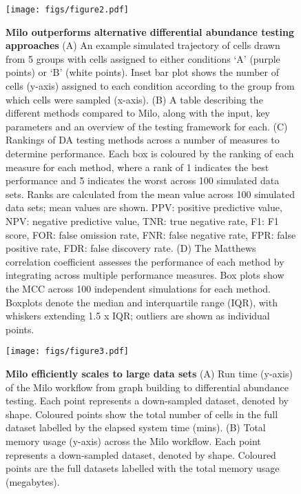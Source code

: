 \documentclass[
  10pt,
]{article}
\begin{document}
\begin{figure}
\centering
\texttt{[image: figs/figure2.pdf]}
\caption{\label{fig:fig-2}\textbf{Milo outperforms alternative differential abundance testing approaches}
(A) An example simulated trajectory of cells drawn from 5 groups with cells assigned to either conditions `A' (purple points) or `B' (white points). Inset bar plot shows the number of cells (y-axis) assigned to each condition according to the group from which cells were sampled (x-axis).
(B) A table describing the different methods compared to Milo, along with the input, key parameters and an overview of the testing framework for each.
(C) Rankings of DA testing methods across a number of measures to determine performance. Each box is coloured by the ranking of each measure for each method, where a rank of 1 indicates the best performance and 5 indicates the worst across 100 simulated data sets. Ranks are calculated from the mean value across 100 simulated data sets; mean values are shown. PPV: positive predictive value, NPV: negative predictive value, TNR: true negative rate, F1: F1 score, FOR: false omission rate, FNR: false negative rate, FPR: false positive rate, FDR: false discovery rate.
(D) The Matthews correlation coefficient assesses the performance of each method by integrating across multiple performance measures. Box plots show the MCC across 100 independent simulations for each method. Boxplots denote the median and interquartile range (IQR), with whiskers extending 1.5 x IQR; outliers are shown as individual points.}
\end{figure}







\begin{figure}
\centering
\texttt{[image: figs/figure3.pdf]}
\caption{\label{fig:fig-3}\textbf{Milo efficiently scales to large data sets}
(A) Run time (y-axis) of the Milo workflow from graph building to differential abundance testing. Each point represents a down-sampled dataset, denoted by shape. Coloured points show the total number of cells in the full dataset labelled by the elapsed system time (mins).
(B) Total memory usage (y-axis) across the Milo workflow. Each point represents a down-sampled dataset, denoted by shape. Coloured points are the full datasets labelled with the total memory usage (megabytes).}
\end{figure}
\end{document}
